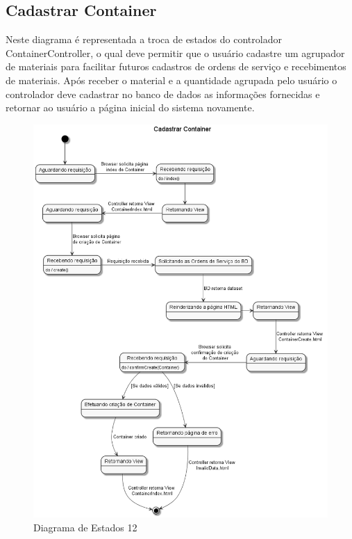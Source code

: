 \documentclass[rascunho,xindy,acronym,symbols]{fei}
\begin{document}
\subsection{Cadastrar Container}

Neste diagrama é representada a troca de estados do controlador ContainerController, o qual deve permitir que o usuário cadastre um agrupador de materiais para facilitar futuros cadastros de ordens de serviço e recebimentos de materiais. Após receber o material e a quantidade agrupada pelo usuário o controlador deve cadastrar no banco de dados as informações fornecidas e retornar ao usuário a página inicial do sistema novamente.

\begin{figure}[H]
    \centering
    \includegraphics[width=\textwidth]{./Images/DE_-_Cadastrar_Container.png}
    \caption{Diagrama de Estados 12}
    \label{fig:diag_est12}
\end{figure}
\end{document}
